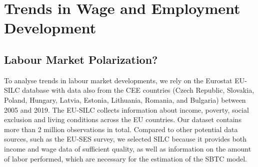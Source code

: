 \documentclass[11pt]{article}
\begin{document}


\section{Trends in Wage and Employment Development}
\subsection{Labour Market Polarization?}\label{wage_analysis}
To analyse trends in labour market developments, we rely on the Eurostat EU-SILC database with data also from the CEE countries (Czech Republic, Slovakia, Poland, Hungary, Latvia, Estonia, Lithuania, Romania, and Bulgaria) between 2005 and 2019. The EU-SILC collects information about income, poverty, social exclusion and living conditions across the EU countries. Our dataset contains more than 2 million observations in total.
Compared to other potential data sources, such as the EU-SES survey, we selected SILC because it provides both income and wage data of sufficient quality, as well as information on the amount of labor performed, which are necessary for the estimation of the SBTC model. 
\end{document}
